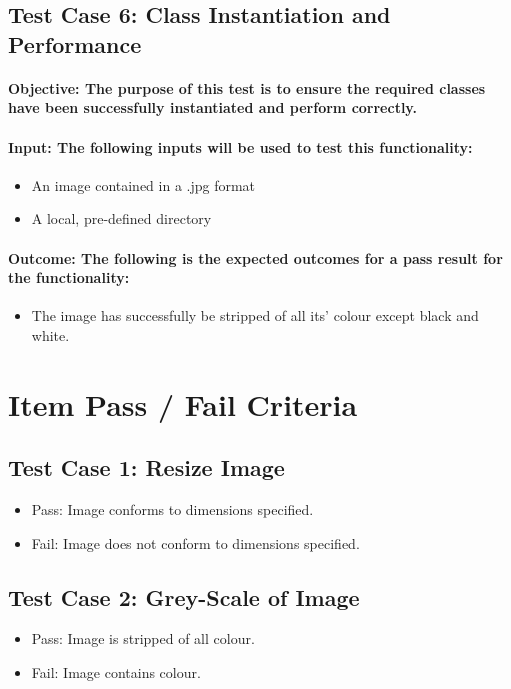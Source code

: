 \documentclass[a4paper,12pt]{report}
\begin{document}
	\subsection{Test Case 6: Class Instantiation and Performance}
	\paragraph{Objective: The purpose of this test is to ensure the required classes have been successfully instantiated and perform correctly.}
	\paragraph{Input: The following inputs will be used to test this functionality:}
	\begin{itemize}
		\item An image contained in a .jpg format
		\item A local, pre-defined directory
	\end{itemize}
	\paragraph{Outcome: The following is the expected outcomes for a pass result for the functionality:}
	\begin{itemize}
		\item The image has successfully be stripped of all its' colour except black and white.
	\end{itemize}
		
\section{Item Pass / Fail Criteria}	
	\subsection{Test Case 1: Resize Image}
		\begin {itemize}
			\item Pass: Image conforms to dimensions specified.
			\item Fail: Image does not conform to dimensions specified.
		\end {itemize}
	\subsection{Test Case 2: Grey-Scale of Image}
		\begin {itemize}
			\item Pass: Image is stripped of all colour.
			\item Fail: Image contains colour.
		\end {itemize}
\end{document}

